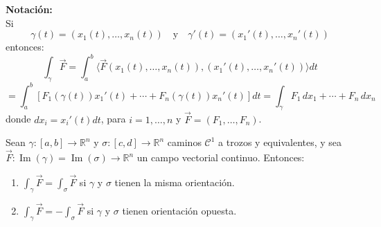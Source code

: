 \textbf{Notación:}\\
Si
\[
    \gamma(t) = (x_1(t), \ldots, x_n(t)) \quad \text{y} \quad \gamma'(t) = (x_1'(t), \ldots, x_n'(t))
\]
entonces:
\[
    \int_\gamma \vec{F} = \int_a^b \langle \vec{F}(x_1(t), \ldots, x_n(t)), (x_1'(t), \ldots, x_n'(t)) \rangle dt
\]
\[
    = \int_a^b \left[ F_1(\gamma(t)) x_1'(t) + \cdots + F_n(\gamma(t)) x_n'(t) \right] dt = \int_\gamma F_1 \, dx_1 + \cdots + F_n \, dx_n
\]
donde $dx_i = x_i'(t) dt$, para $i = 1, \ldots, n$ y $\vec{F} = (F_1, \ldots,
    F_n)$.

\begin{teorema}
    Sean $\gamma : [a, b] \to \mathbb{R}^n$ y $\sigma : [c, d] \to \mathbb{R}^n$ caminos $\mathcal{C}^1$ a trozos y equivalentes, y sea $\vec{F} : \operatorname{Im}(\gamma) = \operatorname{Im}(\sigma) \to \mathbb{R}^n$ un campo vectorial continuo. Entonces:
    \vspace{-0.5em}
    \begin{enumerate}
        \item $\displaystyle \int_\gamma \vec{F} = \int_\sigma \vec{F}$ \quad si $\gamma$ y $\sigma$ tienen la misma orientación.
        \item $\displaystyle \int_\gamma \vec{F} = - \int_\sigma \vec{F}$ \quad si $\gamma$ y $\sigma$ tienen orientación opuesta.
    \end{enumerate}
\end{teorema}

